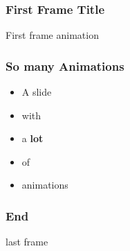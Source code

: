 \documentclass{beamer}
\begin{document}
\begin{frame}
  \frametitle{First Frame Title}
  \pause
  First frame animation
\end{frame}

\begin{frame}
  \frametitle{So many Animations}
  \begin{itemize}
    \item A slide
    \pause
    \item with
    \pause
    \item a \textbf{lot}
    \pause
    \item of
    \pause
    \item animations
  \end{itemize}
\end{frame}

\begin{frame}[t]
  \frametitle{End}
  last frame 
\end{frame}
\end{document}
